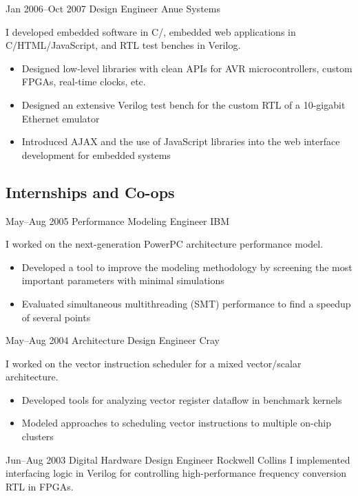\documentclass[11pt,a4paper,roman]{moderncv}
\begin{document}
\cventry%
{Jan 2006--Oct 2007}%
{Design Engineer}%
{Anue Systems}%
{\austin}%
{}%
{I developed embedded software in C/\Cpp, embedded web applications in C/HTML/JavaScript, and RTL test benches in Verilog.
\begin{itemize}
\item Designed low-level libraries with clean APIs for AVR microcontrollers, custom FPGAs, real-time clocks, etc.
\item Designed an extensive Verilog test bench for the custom RTL of a 10-gigabit Ethernet emulator
\item Introduced AJAX and the use of JavaScript libraries into the web interface development for embedded systems
\end{itemize}}


\subsection{Internships and Co-ops}

\cventry%
{May--Aug 2005}%
{Performance Modeling Engineer}%
{IBM}%
{\austin}%
{}%
{I worked on the next-generation PowerPC architecture performance model.
\begin{itemize}
\item Developed a tool to improve the modeling methodology by screening the most important parameters with minimal simulations
\item Evaluated simultaneous multithreading (SMT) performance to find a speedup of several points
\end{itemize}}

\cventry%
{May--Aug 2004}%
{Architecture Design Engineer}%
{Cray}%
{\chippewafalls}%
{}%
{I worked on the vector instruction scheduler for a mixed vector/scalar architecture.
\begin{itemize}
\item Developed tools for analyzing vector register dataflow in benchmark kernels
\item Modeled approaches to scheduling vector instructions to multiple on-chip clusters
\end{itemize}}

\cventry%
{Jun--Aug 2003}%
{Digital Hardware Design Engineer}%
{Rockwell Collins}%
{\whitemarsh}%
{}%
{I implemented interfacing logic in Verilog for controlling high-performance frequency conversion RTL in FPGAs.}
\end{document}

